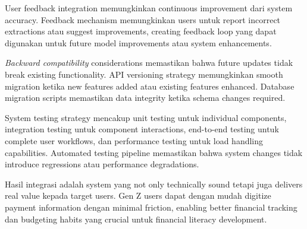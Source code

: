 User feedback integration memungkinkan continuous improvement dari system accuracy. Feedback mechanism memungkinkan users untuk report incorrect extractions atau suggest improvements, creating feedback loop yang dapat digunakan untuk future model improvements atau system enhancements.

\emph{Backward compatibility} considerations memastikan bahwa future updates tidak break existing functionality. API versioning strategy memungkinkan smooth migration ketika new features added atau existing features enhanced. Database migration scripts memastikan data integrity ketika schema changes required.

System testing strategy mencakup unit testing untuk individual components, integration testing untuk component interactions, end-to-end testing untuk complete user workflows, dan performance testing untuk load handling capabilities. Automated testing pipeline memastikan bahwa system changes tidak introduce regressions atau performance degradations.

Hasil integrasi adalah system yang not only technically sound tetapi juga delivers real value kepada target users. Gen Z users dapat dengan mudah digitize payment information dengan minimal friction, enabling better financial tracking dan budgeting habits yang crucial untuk financial literacy development.
